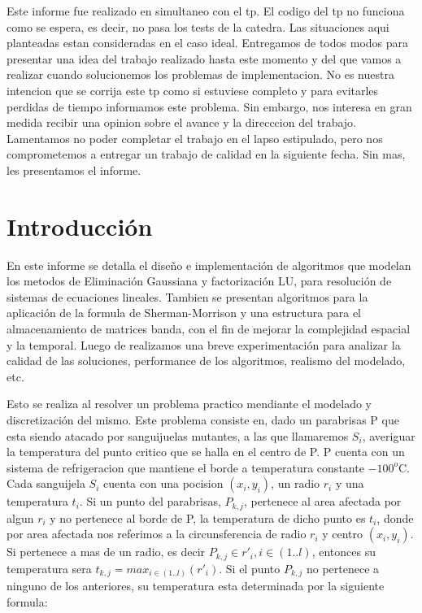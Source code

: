 Este informe fue realizado en simultaneo con el tp. El codigo del tp no funciona como se espera, es decir, no pasa los tests de la catedra. Las situaciones aqui planteadas estan consideradas en el caso ideal. 
Entregamos de todos modos para presentar una idea del trabajo realizado hasta este momento y del que vamos a realizar cuando solucionemos los problemas de implementacion. No es nuestra intencion que se corrija este tp como si 
estuviese completo y para evitarles perdidas de tiempo informamos este problema. Sin embargo, nos interesa en gran medida recibir una opinion sobre el avance y la direcccion del trabajo. Lamentamos no poder
 completar el trabajo en el lapso estipulado, pero nos comprometemos a entregar un trabajo de calidad en la siguiente fecha. Sin mas, les presentamos el informe.

\section{Introducci\'on}

En este informe se detalla el dise\~no e implementaci\'on de algoritmos que modelan los metodos de Eliminaci\'on Gaussiana y factorizaci\'on LU,
para resoluci\'on de sistemas de ecuaciones lineales. Tambien se presentan algoritmos para la aplicaci\'on de la formula de Sherman-Morrison y
una estructura para el almacenamiento de matrices banda, con el fin de mejorar la complejidad espacial y la temporal. Luego de realizamos una %
breve experimentaci\'on para analizar la calidad de las soluciones, performance de los algoritmos, realismo del modelado, etc.

Esto se realiza al resolver un problema practico mendiante el modelado y discretizaci\'on del mismo. Este problema consiste en, dado un parabrisas 
P que esta siendo atacado por sanguijuelas mutantes, a las que llamaremos $S_i$, averiguar la temperatura del punto critico que se
halla en el centro de P. P cuenta con un sistema de refrigeracion que mantiene el borde a temperatura constante
$-100^o$C. Cada sanguijela $S_i$ cuenta con una pocision $(x_i, y_i)$, un radio $r_i$ y una temperatura $t_i$. Si un punto del
parabrisas, $P_{k,j}$, 
pertenece al area afectada por algun $r_i$ y no pertenece al borde de P, la temperatura de dicho punto es $t_i$, donde por area afectada nos referimos a la circunsferencia de 
radio $r_i $ y centro $(x_i, y_i)$. Si pertenece a mas de un radio, es decir
$P_{k,j} \in {r'_i}, i\in (1..l) $, entonces su temperatura sera 
$t_{k,j}=max_{i\in (1..l)}(r'_i) $. Si el punto $P_{k,j}$ no pertenece a ninguno de los anteriores,
su temperatura esta determinada por la siguiente formula:


